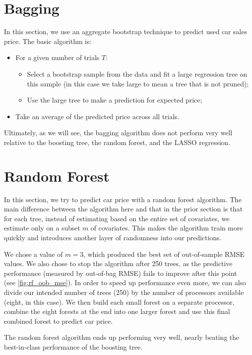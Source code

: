 \documentclass[11pt, fleqn]{article}
\begin{document}
\section{Bagging}

In this section, we use an aggregate bootstrap technique to predict used car sales price. The basic algorithm is:
\begin{itemize}
\item For a given number of trials $T$:
\begin{itemize}
\item Select a bootstrap sample from the data and fit a large regression tree on this sample (in this case we take large to mean a tree that is not pruned);
\item Use the large tree to make a prediction for expected price;
\end{itemize}
\item Take an average of the predicted price across all trials.
\end{itemize}

Ultimately, as we will see, the bagging algorithm does not perform very well relative to the boosting tree, the random forest, and the LASSO regression. 

\section{Random Forest}

In this section, we try to predict car price with a random forest algorithm. The main difference between the algorithm here and that in the prior section is that for each tree, instead of estimating based on the entire set of covariates, we estimate only on a subset $m$ of covariates. This makes the algorithm train more quickly and introduces another layer of randomness into our predictions. 

We chose a value of $m=3$, which produced the best set of out-of-sample RMSE values. We also chose to stop the algorithm after 250 trees, as the predictive performance (measured by out-of-bag RMSE) fails to improve after this point (see \cref{fig:rf_oob_mse}). In order to speed up performance even more, we can also divide our intended number of trees (250) by the number of processors available (eight, in this case). We then build each small forest on a separate processor, combine the eight forests at the end into one larger forest and use this final combined forest to predict car price.

The random forest algorithm ends up performing very well, nearly beating the best-in-class performance of the boosting tree.
\end{document}
